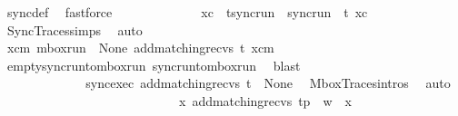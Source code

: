 \begin{isabellebody}
\ sync{\isacharunderscore}{\kern0pt}def\ \isamarkupfalse%
\ fastforce\isanewline
\ \ \ \ \ \ \ \ \ \ \isamarkupfalse%
\ \isamarkupfalse%
\ xc\ \ t{\isacharunderscore}{\kern0pt}sync{\isacharunderscore}{\kern0pt}run\ {\isacharcolon}{\kern0pt}\ {\isachardoublequoteopen}sync{\isacharunderscore}{\kern0pt}run\ {\isasymC}\isactrlsub {\isasymI}\isactrlsub {\isasymzero}\ t\ xc{\isachardoublequoteclose}\ \isamarkupfalse%
\ SyncTraces{\isachardot}{\kern0pt}simps\ \isamarkupfalse%
\ auto\isanewline
\ \ \ \ \ \ \ \ \ \ \ \ \ \ \isanewline
\ \ \ \ \ \ \ \ \ \ \isamarkupfalse%
\ \isamarkupfalse%
\ {\isachardoublequoteopen}{\isasymexists}xcm{\isachardot}{\kern0pt}\ mbox{\isacharunderscore}{\kern0pt}run\ {\isasymC}\isactrlsub {\isasymI}\isactrlsub {\isasymmm}\ None\ {\isacharparenleft}{\kern0pt}add{\isacharunderscore}{\kern0pt}matching{\isacharunderscore}{\kern0pt}recvs\ t{\isacharparenright}{\kern0pt}\ xcm{\isachardoublequoteclose}\ \isamarkupfalse%
\ empty{\isacharunderscore}{\kern0pt}sync{\isacharunderscore}{\kern0pt}run{\isacharunderscore}{\kern0pt}to{\isacharunderscore}{\kern0pt}mbox{\isacharunderscore}{\kern0pt}run\ sync{\isacharunderscore}{\kern0pt}run{\isacharunderscore}{\kern0pt}to{\isacharunderscore}{\kern0pt}mbox{\isacharunderscore}{\kern0pt}run\ \isamarkupfalse%
\ blast\isanewline
\ \ \ \ \ \ \ \ \ \ \ \ \ \ \isanewline
\ \ \ \ \ \ \ \ \ \ \isamarkupfalse%
\ \isamarkupfalse%
\ sync{\isacharunderscore}{\kern0pt}exec{\isacharcolon}{\kern0pt}\ {\isachardoublequoteopen}{\isacharparenleft}{\kern0pt}add{\isacharunderscore}{\kern0pt}matching{\isacharunderscore}{\kern0pt}recvs\ t{\isacharparenright}{\kern0pt}\ {\isasymin}\ {\isasymT}\isactrlbsub None\isactrlesub {\isachardoublequoteclose}\ \isamarkupfalse%
\ MboxTraces{\isachardot}{\kern0pt}intros\ \isamarkupfalse%
\ auto\isanewline
\ \ \ \ \ \ \ \ \ \ \ \ \ \ \isanewline
\ \ \ \ \ \ \ \ \ \ \isamarkupfalse%
\ \isamarkupfalse%
\ {\isachardoublequoteopen}{\isasymexists}x{\isachardot}{\kern0pt}\ {\isacharparenleft}{\kern0pt}add{\isacharunderscore}{\kern0pt}matching{\isacharunderscore}{\kern0pt}recvs\ t{\isacharparenright}{\kern0pt}{\isasymdown}\isactrlsub p\ {\isacharequal}{\kern0pt}\ w\ {\isasymsqdot}\ x{\isachardoublequoteclose}\ \isamarkupfalse%
\isanewline
\ \ \ \ \ \ \ \ \ \ \isamarkupfalse%

\end{isabellebody}
